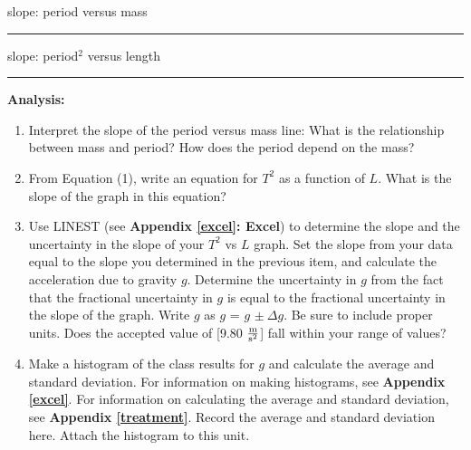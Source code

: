\vspace{10pt}

slope: period versus mass \rule{1.5in}{0.2pt}

\vspace{10pt}

slope: period$^2$ versus length \rule{1.5in}{0.2pt}

\vspace{10pt}

{\noindent \bf Analysis:}

\begin{enumerate}
\item Interpret the slope of the period versus mass line: What is the relationship between mass and period? How does the period depend on the mass? 
\vspace{20mm}

\item From Equation (1), write an equation for $T^2$ as a function of $L$. What is the slope of the graph in this equation?
\vspace{30mm}


\item Use LINEST (see \textbf{Appendix \ref{excel}: Excel}) to determine the slope and the uncertainty in the slope of your $T^2$ vs $L$ graph. Set the slope from your data equal to the slope you determined in the previous item, and calculate the acceleration due to gravity $g$. Determine the uncertainty in $g$ from the fact that the fractional uncertainty in $g$ is equal to the fractional uncertainty in the slope of the graph. Write $g$ as $g$ = $g$ \( \pm \ \Delta  g\). Be sure to include proper units. Does the accepted value of [9.80 $\frac{\rm m}{\rm s^2}$] fall within your range of values?
\vspace{30mm}

\item Make a histogram of the class results for $g$ and calculate the average and standard deviation. For information on making histograms, see \textbf{Appendix \ref{excel}}. For information on calculating the average and standard deviation, see \textbf{Appendix \ref{treatment}}. Record the average and standard deviation here. Attach the histogram to this unit.
\end{enumerate}
